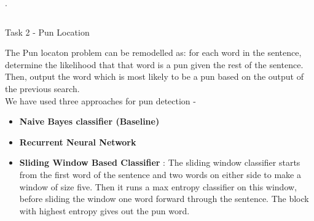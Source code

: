 \documentclass[final]{beamer}
\newlength{\onecolwid}
\newlength{\twocolwid}
\begin{document}
\begin{frame}[t]
\begin{columns}[t]
\begin{column}{\twocolwid}
\begin{columns}[t,totalwidth=\twocolwid]
\begin{column}{\onecolwid}
\end{column} %

\end{columns} %

\begin{block}
    {.}
\end{block}

\begin{columns}[t,totalwidth=\twocolwid] %

\begin{column}{\onecolwid} %


\begin{block}{Task 2 - Pun Location}
        {\large The Pun locaton problem can be remodelled as: for each word in the sentence, determine the likelihood that that word is a pun given the rest of the sentence. Then, output the word which is most likely to be a pun based on the output of the previous search. \\
        We have used three approaches for pun detection - 
        \begin{itemize}
          \item {\textbf{Naive Bayes classifier (Baseline)}}
           \item {\textbf{Recurrent Neural Network} %
           }
          \item {\textbf{Sliding Window Based Classifier} : The sliding window classifier starts from the first word of the sentence and two words on either side to make a window of size five. Then it runs a max entropy classifier on this window, before sliding the window one word forward through the sentence. The block with highest entropy gives out the pun word.}
          \end{itemize}
          \\
        }
      \end{block}
      


\end{column}
\end{columns}
\end{column}
\end{columns}
\end{frame}
\end{document}
